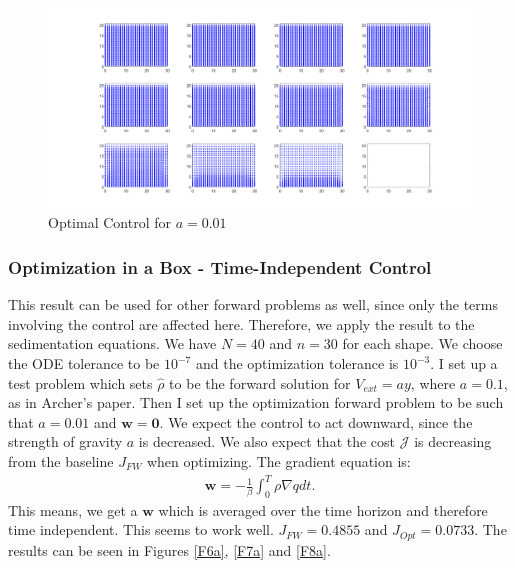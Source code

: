 \documentclass[11pt, a4paper]{article}
\theoremstyle{definition}
\newcommand{\w}{\mathbf{w}}
\newcommand{\hr}{\widehat \rho}
\begin{document}
\begin{figure}[h]
	\centering
	\includegraphics[scale=0.35]{F31.png}
	\caption{Optimal Control for $a = 0.01$} 
	\label{Fa3}
\end{figure}


\subsubsection{Optimization in a Box - Time-Independent Control}
This result can be used for other forward problems as well, since only the terms involving the control are affected here. Therefore, we apply the result to the sedimentation equations.
We have $N = 40$ and $n = 30$ for each shape. We choose the ODE tolerance to be $10^{-7}$ and the optimization tolerance is $10^{-3}$.
I set up a test problem which sets $\hr$ to be the forward solution for $V_{ext} = ay$, where $a = 0.1$, as in Archer's paper. Then I set up the optimization forward problem to be such that $a = 0.01$ and $\w = \mathbf 0$. We expect the control to act downward, since the strength of gravity $a$ is decreased.
We also expect that the cost $\mathcal J$ is decreasing from the baseline $J_{FW}$ when optimizing.
The gradient equation is:
\begin{align*}
	\w = - \frac{1}{\beta}\int_0^T \rho \nabla q dt.
\end{align*}
This means, we get a $\w$ which is averaged over the time horizon and therefore time independent. This seems to work well. $J_{FW} = 0.4855$ and $J_{Opt} = 0.0733$. The results can be seen in Figures \ref{F6a}, \ref{F7a} and \ref{F8a}.
\end{document}
